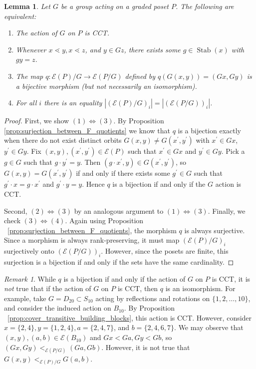 \documentclass[smallextended, envcountsame, numbook]{svjour3}
\theoremstyle{plain}
\newtheorem{lem}[thm]{Lemma}
\theoremstyle{definition}
\theoremstyle{remark}
\newtheorem{rmk}[thm]{Remark}
\numberwithin{equation}{section}
\renewcommand{\iff}{\Leftrightarrow}
\newcommand\Stab{\operatorname{Stab}}
\begin{document}
\begin{lem}
\label{lem:cover_transitive_equivalence}
Let $G$ be a group acting on a graded poset $P$. The following are equivalent:
\begin{enumerate}
  \item The action of $G$ on $P$ is CCT.
  \item Whenever $x \lessdot y,x \lessdot z$, and $y \in Gz$, there exists some $g \in \Stab(x)$ with $gy = z$.
  \item The map $q\colon \mathcal E(P)/G\rightarrow \mathcal E(P/G)$ defined by $q(G(x, y)) = (Gx,Gy)$ is a bijective morphism (but not necessarily an isomorphism).
  \item For all $i$ there is an equality $|(\mathcal E(P)/G)_i|=| (\mathcal E(P/G))_i|$.
\end{enumerate}
\end{lem}
\begin{proof}
First, we show $(1) \iff (3)$. By Proposition \ref{prop:surjection_between_F_quotients} we know that $q$ is a bijection exactly when there do not exist distinct orbits $G(x, y) \ne G(x^\prime, y^\prime)$ with $x^\prime\in Gx$, $y^\prime\in Gy$.  Fix $(x, y), (x^\prime, y^\prime)\in \mathcal E(P)$ such that $x^\prime\in Gx$ and $y^\prime\in Gy$.  Pick a $g\in G$ such that $g\cdot y^\prime = y$.  Then $(g\cdot x^\prime, y)\in G(x^\prime, y^\prime)$, so $G(x, y) = G(x^\prime, y^\prime)$ if and only if there exists some $g^\prime\in G$ such that $g^\prime\cdot x = g\cdot x^\prime$ and $g^\prime\cdot y = y$. Hence $q$ is a bijection if and only if the $G$ action is CCT.

Second, $(2) \iff (3)$ by an analogous argument to $(1) \iff (3)$.
Finally, we check $(3)\iff (4)$. Again using Proposition ~\ref{prop:surjection_between_F_quotients}, the morphism $q$ is always surjective. Since a morphism is always rank-preserving, it must map $(\mathcal E(P)/G)_i$ surjectively onto $(\mathcal E(P/G))_i$. However, since the posets are finite, this surjection is a bijection if and only if the sets have the same cardinality.
\end{proof}

\begin{rmk}
While $q$ is a bijection if and only if the action of $G$ on $P$ is CCT, it is {\it not} true that if the action of $G$ on $P$ is CCT, then $q$ is an isomorphism.  For example, take $G=D_{20} \subset S_{10}$ acting by reflections and rotations on $\{1,2,\ldots,10\}$, and consider the induced action on $B_{10}$. By Proposition ~\ref{prop:cover_transitive_building_blocks}, this action is CCT. However, consider $x = \{2,4\},y = \{1,2,4\},a = \{2,4,7\}$, and $b = \{2,4,6,7\}$. We may observe that $(x , y),(a, b) \in \mathcal E(B_{10})$ and $Gx < Ga, Gy < Gb$, so $(Gx, Gy) <_{\mathcal E(P/G)} (Ga, Gb)$. However, it is not true that $G(x, y)<_{\mathcal E(P)/G} G(a,b)$. \end{rmk}
\end{document}
